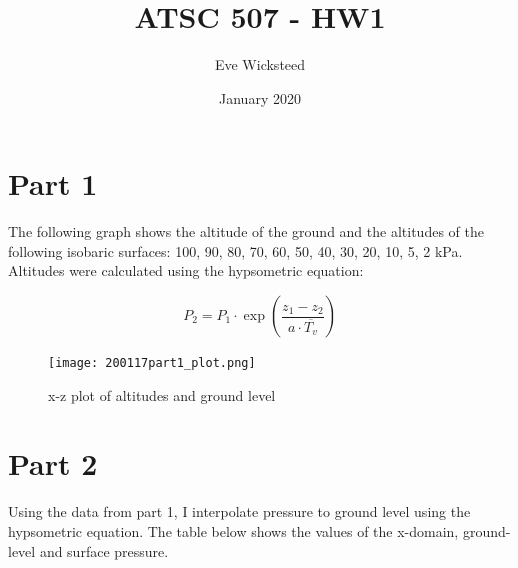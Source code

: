 \documentclass[12pt]{article}
\title{ATSC 507 - HW1}
\author{Eve Wicksteed}
\date{January 2020}
\begin{document}
\maketitle

\section*{Part 1}

The following graph shows the altitude of the ground and the altitudes of the following isobaric surfaces: 100, 90, 80, 70, 60, 50, 40, 30, 20, 10, 5, 2 kPa.
Altitudes were calculated using the hypsometric equation:

$$
P_{2}=P_{1} \cdot \exp \left(\frac{z_{1}-z_{2}}{a \cdot \overline{T_{v}}}\right)
$$


\graphicspath{ {/Users/ewicksteed/Documents/Eve/507/HW1/} }

\begin{figure}[h]
    \centering
    \texttt{[image: 200117part1\_plot.png]}
    \caption{x-z plot of altitudes and ground level}
    \label{fig:mesh1}
\end{figure}


\section*{Part 2}
Using the data from part 1, I interpolate pressure to ground level using the hypsometric equation. 
The table below shows the values of the x-domain, ground-level and surface pressure. 
\end{document}
